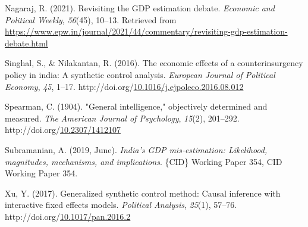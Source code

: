 \documentclass[12pt,nobind, a4paper]{reedthesis}
\newlength{\cslhangindent}
\newenvironment{CSLReferences}[2] %
{%
	\setlength{\parindent}{0pt}
	\ifodd #1 \everypar{\setlength{\hangindent}{\cslhangindent}}\ignorespaces\fi
	\ifnum #2 > 0
	\setlength{\parskip}{#2\baselineskip}
	\fi
}%
{}
\begin{document}
\begin{CSLReferences}{1}{0}
 \leavevmode{}%
 Nagaraj, R. (2021). Revisiting the {GDP} estimation debate. \emph{Economic and Political Weekly}, \emph{56}(45), 10--13. Retrieved from \url{https://www.epw.in/journal/2021/44/commentary/revisiting-gdp-estimation-debate.html}

 \leavevmode{}%
 Singhal, S., \& Nilakantan, R. (2016). The economic effects of a counterinsurgency policy in india: A synthetic control analysis. \emph{European Journal of Political Economy}, \emph{45}, 1--17. http://doi.org/\href{https://doi.org/10.1016/j.ejpoleco.2016.08.012}{10.1016/j.ejpoleco.2016.08.012}

 \leavevmode{}%
 Spearman, C. (1904). "General intelligence," objectively determined and measured. \emph{The American Journal of Psychology}, \emph{15}(2), 201--292. http://doi.org/\href{https://doi.org/10.2307/1412107}{10.2307/1412107}

 \leavevmode{}%
 Subramanian, A. (2019, June). \emph{India's {GDP} mis-estimation: Likelihood, magnitudes, mechanisms, and implications}. \{CID\} Working Paper 354, {CID} Working Paper 354.

 \leavevmode{}%
 Xu, Y. (2017). Generalized synthetic control method: Causal inference with interactive fixed effects models. \emph{Political Analysis}, \emph{25}(1), 57--76. http://doi.org/\href{https://doi.org/10.1017/pan.2016.2}{10.1017/pan.2016.2}

 \end{CSLReferences}
	
	
\end{document}
